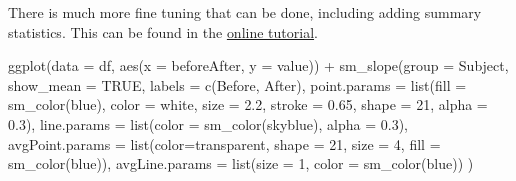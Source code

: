 \documentclass[
  letterpaper,
  DIV=11,
  numbers=noendperiod]{scrreprt}
\newenvironment{Shaded}{\begin{snugshade}}{\end{snugshade}}
\newcommand{\AttributeTok}[1]{\textcolor[rgb]{0.40,0.45,0.13}{#1}}
\newcommand{\ConstantTok}[1]{\textcolor[rgb]{0.56,0.35,0.01}{#1}}
\newcommand{\DecValTok}[1]{\textcolor[rgb]{0.68,0.00,0.00}{#1}}
\newcommand{\FloatTok}[1]{\textcolor[rgb]{0.68,0.00,0.00}{#1}}
\newcommand{\FunctionTok}[1]{\textcolor[rgb]{0.28,0.35,0.67}{#1}}
\newcommand{\NormalTok}[1]{\textcolor[rgb]{0.00,0.23,0.31}{#1}}
\newcommand{\SpecialCharTok}[1]{\textcolor[rgb]{0.37,0.37,0.37}{#1}}
\newcommand{\StringTok}[1]{\textcolor[rgb]{0.13,0.47,0.30}{#1}}
\begin{document}
There is much more fine tuning that can be done, including adding
summary statistics. This can be found in the
\href{https://smin95.github.io/dataviz/slope-charts-point-plots-bland-altman-forests-rainclouds-histograms-part-2.html}{online
tutorial}.

\begin{Shaded}
\begin{Highlighting}[]
\FunctionTok{ggplot}\NormalTok{(}\AttributeTok{data =}\NormalTok{ df, }\FunctionTok{aes}\NormalTok{(}\AttributeTok{x =}\NormalTok{ beforeAfter, }\AttributeTok{y =}\NormalTok{ value)) }\SpecialCharTok{+}
  \FunctionTok{sm\_slope}\NormalTok{(}\AttributeTok{group =}\NormalTok{ Subject,}
           \AttributeTok{show\_mean =} \ConstantTok{TRUE}\NormalTok{,}
           \AttributeTok{labels =} \FunctionTok{c}\NormalTok{(}\StringTok{\textquotesingle{}Before\textquotesingle{}}\NormalTok{, }\StringTok{\textquotesingle{}After\textquotesingle{}}\NormalTok{),}
           \AttributeTok{point.params =} \FunctionTok{list}\NormalTok{(}\AttributeTok{fill =} \FunctionTok{sm\_color}\NormalTok{(}\StringTok{\textquotesingle{}blue\textquotesingle{}}\NormalTok{),}
                               \AttributeTok{color =} \StringTok{\textquotesingle{}white\textquotesingle{}}\NormalTok{,}
                               \AttributeTok{size =} \FloatTok{2.2}\NormalTok{,}
                               \AttributeTok{stroke =} \FloatTok{0.65}\NormalTok{,}
                               \AttributeTok{shape =} \DecValTok{21}\NormalTok{,}
                               \AttributeTok{alpha =} \FloatTok{0.3}\NormalTok{),}
           \AttributeTok{line.params =} \FunctionTok{list}\NormalTok{(}\AttributeTok{color =} \FunctionTok{sm\_color}\NormalTok{(}\StringTok{\textquotesingle{}skyblue\textquotesingle{}}\NormalTok{),}
                              \AttributeTok{alpha =} \FloatTok{0.3}\NormalTok{),}
            \AttributeTok{avgPoint.params =} \FunctionTok{list}\NormalTok{(}\AttributeTok{color=}\StringTok{\textquotesingle{}transparent\textquotesingle{}}\NormalTok{, }\AttributeTok{shape =} \DecValTok{21}\NormalTok{,}
                                  \AttributeTok{size =} \DecValTok{4}\NormalTok{, }\AttributeTok{fill =} \FunctionTok{sm\_color}\NormalTok{(}\StringTok{\textquotesingle{}blue\textquotesingle{}}\NormalTok{)),}
           \AttributeTok{avgLine.params =} \FunctionTok{list}\NormalTok{(}\AttributeTok{size =} \DecValTok{1}\NormalTok{, }\AttributeTok{color =} \FunctionTok{sm\_color}\NormalTok{(}\StringTok{\textquotesingle{}blue\textquotesingle{}}\NormalTok{))}
\NormalTok{           )}
\end{Highlighting}
\end{Shaded}
\end{document}
